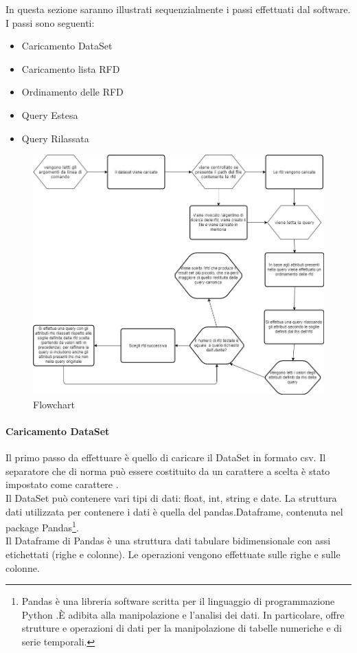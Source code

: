 In questa sezione saranno illustrati sequenzialmente i passi effettuati dal software. I passi sono  seguenti:
\begin{itemize}[noitemsep]
    \item Caricamento DataSet
    \item Caricamento lista RFD
    \item Ordinamento delle RFD
    \item Query Estesa
    \item Query Rilassata
\end{itemize}
\begin{figure}[H]
\centering
\includegraphics[width=\textwidth,height=\textheight,keepaspectratio]{images/Flowchart.jpg}
\caption{Flowchart}\label{fig:4}
\end{figure}
\paragraph{Caricamento DataSet}
Il primo passo da effettuare è quello di caricare il DataSet in formato csv. Il separatore che di norma può essere costituito da un carattere a scelta è stato impostato come carattere \quotes{;} .\\ Il DataSet può contenere vari tipi di dati: float, int, string e date.
La struttura dati utilizzata per contenere i dati è quella del pandas.Dataframe, contenuta nel package Pandas\footnote{Pandas è una libreria software scritta per il linguaggio di programmazione Python .È adibita alla manipolazione e l'analisi dei dati. In particolare, offre strutture e operazioni di dati per la manipolazione di tabelle numeriche e di serie temporali. }. \\Il Dataframe di Pandas è una struttura dati tabulare bidimensionale con assi etichettati (righe e colonne). Le operazioni vengono effettuate sulle righe e sulle colonne. 
